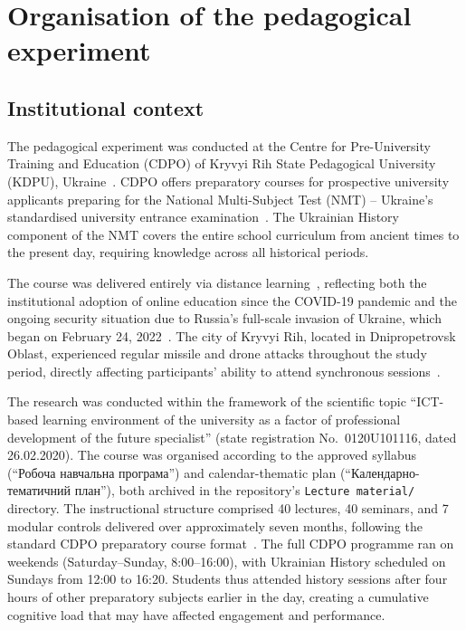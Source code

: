  \label{ch:methodology}

\section{Organisation of the pedagogical experiment} \label{sec:organisation}

\subsection{Institutional context}

The pedagogical experiment was conducted at the Centre for Pre-University Training and Education (CDPO) of Kryvyi Rih State Pedagogical University (KDPU), Ukraine~\cite{KSPU}. CDPO offers preparatory courses for prospective university applicants preparing for the National Multi-Subject Test (NMT) -- Ukraine's standardised university entrance examination~\cite{Lokshyna2018302}. The Ukrainian History component of the NMT covers the entire school curriculum from ancient times to the present day, requiring knowledge across all historical periods.

The course was delivered entirely via distance learning~\cite{Hlianenko2024, Zamkova2023299}, reflecting both the institutional adoption of online education since the COVID-19 pandemic and the ongoing security situation due to Russia's full-scale invasion of Ukraine, which began on February 24, 2022~\cite{Martynets202428, Vovchasta2024, Maslova2021}. The city of Kryvyi Rih, located in Dnipropetrovsk Oblast, experienced regular missile and drone attacks throughout the study period, directly affecting participants' ability to attend synchronous sessions~\cite{Zamkova2023299}.

The research was conducted within the framework of the scientific topic ``ICT-based learning environment of the university as a factor of professional development of the future specialist'' (state registration No.~0120U101116, dated 26.02.2020). The course was organised according to the approved syllabus (``Робоча навчальна програма'') and calendar-thematic plan (``Календарно-тематичний план''), both archived in the repository's \texttt{Lecture material/} directory. The instructional structure comprised 40 lectures, 40 seminars, and 7 modular controls delivered over approximately seven months, following the standard CDPO preparatory course format~\cite{KSPU}. The full CDPO programme ran on weekends (Saturday--Sunday, 8:00--16:00), with Ukrainian History scheduled on Sundays from 12:00 to 16:20. Students thus attended history sessions after four hours of other preparatory subjects earlier in the day, creating a cumulative cognitive load that may have affected engagement and performance.

